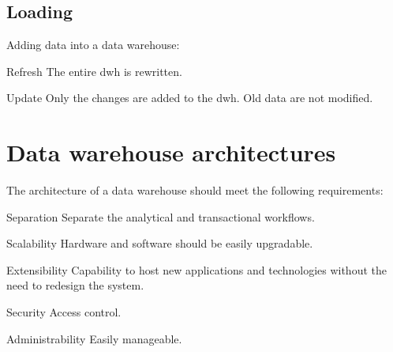 \subsection{Loading}
Adding data into a data warehouse:
\begin{descriptionlist}
    \item[Refresh] 
        The entire \ac{dwh} is rewritten.

    \item[Update] 
        Only the changes are added to the \ac{dwh}. Old data are not modified.
\end{descriptionlist}



\section{Data warehouse architectures}

The architecture of a data warehouse should meet the following requirements:
\begin{descriptionlist}
    \item[Separation] Separate the analytical and transactional workflows.
    \item[Scalability] Hardware and software should be easily upgradable.
    \item[Extensibility] Capability to host new applications and technologies without the need to redesign the system.
    \item[Security] Access control.
    \item[Administrability] Easily manageable.
\end{descriptionlist}

